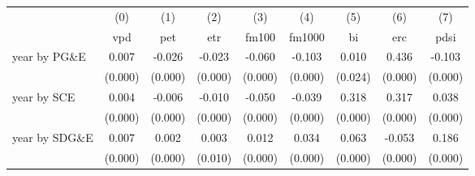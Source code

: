 \begin{tabular}{lcccccccc} \toprule 
 \midrule 
& (0)& (1)& (2)& (3)& (4)& (5)& (6)& (7)\\ 
& vpd& pet& etr& fm100& fm1000& bi& erc& pdsi\\ 
\midrule 
 year by PG\&E & 0.007  & -0.026  & -0.023  & -0.060  & -0.103  & 0.010  & 0.436  & -0.103 \\ 
 & (0.000)  & (0.000)  & (0.000)  & (0.000)  & (0.000)  & (0.024)  & (0.000)  & (0.000) \\ 
year by SCE & 0.004  & -0.006  & -0.010  & -0.050  & -0.039  & 0.318  & 0.317  & 0.038 \\ 
 & (0.000)  & (0.000)  & (0.000)  & (0.000)  & (0.000)  & (0.000)  & (0.000)  & (0.000) \\ 
year by SDG\&E & 0.007  & 0.002  & 0.003  & 0.012  & 0.034  & 0.063  & -0.053  & 0.186 \\ 
 & (0.000)  & (0.000)  & (0.010)  & (0.000)  & (0.000)  & (0.000)  & (0.000)  & (0.000) \\ 
\bottomrule 
\end{tabular}